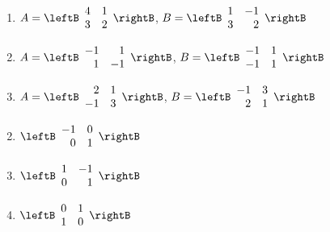 \begin{multicols}{2}
\begin{ex}
\begin{enumerate}[label={\alph*.}]
\item $A = \leftB \begin{array}{rr}
4 & 1 \\
3 & 2
\end{array} \rightB$, 
$B = \leftB \begin{array}{rr}
1 & -1 \\
3 & 2
\end{array} \rightB$

\item $A = \leftB \begin{array}{rr}
-1 & 1 \\
1 & -1
\end{array} \rightB$, 
$B = \leftB \begin{array}{rr}
-1 & 1 \\
-1 & 1
\end{array} \rightB$

\item $A = \leftB \begin{array}{rr}
2 & 1 \\
-1 & 3
\end{array} \rightB$, 
$B = \leftB \begin{array}{rr}
-1 & 3 \\
2 & 1
\end{array} \rightB$

\end{enumerate}
\begin{sol}
\begin{enumerate}[label={\alph*.}]
\setcounter{enumi}{1}
\item $\leftB \begin{array}{rr}
-1 & 0 \\
0 & 1
\end{array} \rightB$

\setcounter{enumi}{3}
\item $\leftB \begin{array}{rr}
1 & -1 \\
0 & 1
\end{array} \rightB$

\setcounter{enumi}{5}
\item $\leftB \begin{array}{rr}
0 & 1 \\
1 & 0
\end{array} \rightB$

\end{enumerate}
\end{sol}
\end{ex}


\end{multicols}
